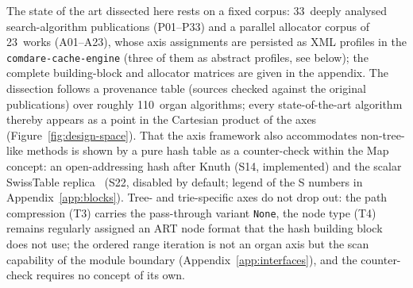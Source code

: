 \begin{nurkurz}
The state of the art dissected here rests on a fixed corpus: 33~deeply analysed search-algorithm
publications (P01--P33) and a parallel allocator corpus of 23~works (A01--A23), whose axis assignments are
persisted as XML profiles in the \texttt{comdare-cache-engine} (three of them as abstract profiles, see
below); the complete building-block and allocator matrices are given in the appendix. The dissection
follows a provenance table (sources checked against the original publications) over roughly 110~organ
algorithms; every state-of-the-art algorithm thereby appears as a point in the Cartesian product of the
axes (Figure~\ref{fig:design-space}). That the axis framework also accommodates non-tree-like methods is
shown by a pure hash table as a counter-check within the Map concept: an open-addressing hash after Knuth
(S14, implemented) and the scalar SwissTable replica~\cite{abseil_swisstable} (S22, disabled by default;
legend of the S numbers in Appendix~\ref{app:blocks}). Tree- and trie-specific axes do not drop out: the
path compression (T3) carries the pass-through variant \texttt{None}, the node type (T4) remains regularly
assigned an ART node format that the hash building block does not use; the ordered range iteration is not
an organ axis but the scan capability of the module boundary (Appendix~\ref{app:interfaces}), and the
counter-check requires no concept of its own.
\end{nurkurz}

